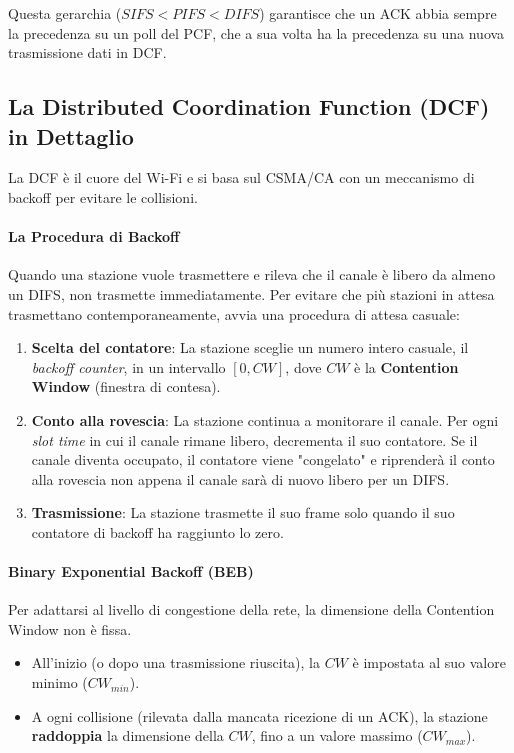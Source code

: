 Questa gerarchia ($SIFS < PIFS < DIFS$) garantisce che un ACK abbia sempre la precedenza su un poll del PCF, che a sua volta ha la precedenza su una nuova trasmissione dati in DCF.


\subsection{La Distributed Coordination Function (DCF) in Dettaglio}
La DCF è il cuore del Wi-Fi e si basa sul CSMA/CA con un meccanismo di backoff per evitare le collisioni.

\paragraph{La Procedura di Backoff}
Quando una stazione vuole trasmettere e rileva che il canale è libero da almeno un DIFS, non trasmette immediatamente. Per evitare che più stazioni in attesa trasmettano contemporaneamente, avvia una procedura di attesa casuale:
\begin{enumerate}
    \item \textbf{Scelta del contatore}: La stazione sceglie un numero intero casuale, il \textit{backoff counter}, in un intervallo $[0, CW]$, dove $CW$ è la \textbf{Contention Window} (finestra di contesa).
    \item \textbf{Conto alla rovescia}: La stazione continua a monitorare il canale. Per ogni \textit{slot time} in cui il canale rimane libero, decrementa il suo contatore. Se il canale diventa occupato, il contatore viene "congelato" e riprenderà il conto alla rovescia non appena il canale sarà di nuovo libero per un DIFS.
    \item \textbf{Trasmissione}: La stazione trasmette il suo frame solo quando il suo contatore di backoff ha raggiunto lo zero.
\end{enumerate}

\paragraph{Binary Exponential Backoff (BEB)}
Per adattarsi al livello di congestione della rete, la dimensione della Contention Window non è fissa.
\begin{itemize}
    \item All'inizio (o dopo una trasmissione riuscita), la $CW$ è impostata al suo valore minimo ($CW_{min}$).
    \item A ogni collisione (rilevata dalla mancata ricezione di un ACK), la stazione \textbf{raddoppia} la dimensione della $CW$, fino a un valore massimo ($CW_{max}$).
\end{itemize}

